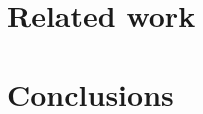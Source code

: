 \section{Related work}
\label{section:related_work}

\section{Conclusions}
\label{section:discussion}


\cleardoublepage

